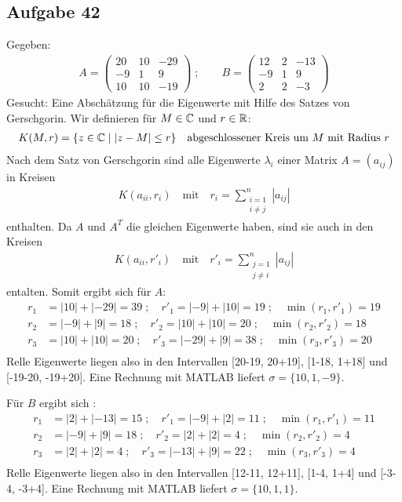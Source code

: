 \subsection*{Aufgabe 42}

Gegeben:
\begin{align*}
  A = \begin{pmatrix}20&10&-29\\ -9&1&9\\ 10&10&-19\end{pmatrix}\; ;  \qquad
  B = \begin{pmatrix}12&2&-13\\ -9&1&9\\ 2&2&-3\end{pmatrix}
\end{align*}
Gesucht: Eine Abschätzung für die Eigenwerte mit Hilfe des Satzes von Gerschgorin.
Wir definieren für $M \in \mathbb C$ und $r \in \mathbb R$:
\begin{align*}
  K(M,r) = \{z\in \mathbb C \mid | z - M | \le r\} \quad \text{abgeschlossener Kreis um $M$ mit Radius $r$}
\end{align*}
Nach dem Satz von Gerschgorin sind alle Eigenwerte $\lambda_i$ einer Matrix $A = (a_{ij})$
in Kreisen
\begin{align*}
  K(a_{ii}, r_i) \quad \text{mit} \quad r_i = \sum_{\substack{i = 1\\i \ne j}}^n |a_{ij} |
\end{align*}
enthalten. Da $A$ und $A^T$ die gleichen Eigenwerte haben, sind sie auch in den Kreisen
\begin{align*}
  K(a_{ii}, r'_i) \quad \text{mit} \quad r'_i = \sum_{\substack{j = 1\\j \ne i}}^n |a_{ij} |
\end{align*}
entalten. Somit ergibt sich für $A$:
\begin{align*}
  r_1 &= |10| + |-29| = 39\;; \quad r'_1 = |-9| + |10| = 19\;; \quad\min(r_1, r'_1) = 19\\
  r_2 &= |-9| + |9| = 18\;; \quad r'_2 = |10| + |10| = 20\;; \quad \min(r_2, r'_2) = 18\\
  r_3 &= |10| + |10| = 20\;; \quad r'_3 = |-29| + |9| = 38\;; \quad \min(r_3, r'_3) = 20\\
\end{align*}
Relle Eigenwerte liegen also in den Intervallen [20-19, 20+19], [1-18, 1+18] und [-19-20, -19+20].
Eine Rechnung mit MATLAB liefert $\sigma = \{10, 1, -9\}$.

Für $B$ ergibt sich :
\begin{align*}
  r_1 &= |2| + |-13| = 15\;; \quad r'_1 = |-9| + |2| = 11\;; \quad\min(r_1, r'_1) = 11\\
  r_2 &= |-9| + |9| = 18\;; \quad r'_2 = |2| + |2| = 4\;; \quad \min(r_2, r'_2) = 4\\
  r_3 &= |2| + |2| = 4\;; \quad r'_3 = |-13| + |9| = 22\;; \quad \min(r_3, r'_3) = 4\\
\end{align*}
Relle Eigenwerte liegen also in den Intervallen [12-11, 12+11], [1-4, 1+4] und [-3-4, -3+4].
Eine Rechnung mit MATLAB liefert $\sigma = \{10, 1, 1\}$.
